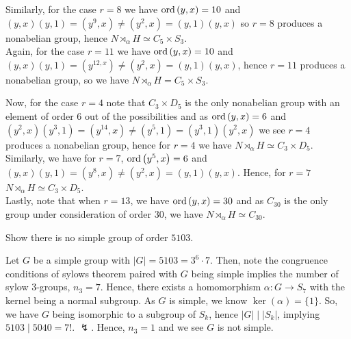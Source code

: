 \documentclass[a4paper]{article}
\begin{document}
\begin{solution}
\begin{enumerate}
				Similarly, for the case \(r = 8\) we have \(\operatorname{ord}\left( y, x \right)  = 10\) and \(\left( y, x \right) \left( y, 1 \right) = \left( y^{9}, x \right) \neq \left( y^2, x \right)  = \left( y, 1 \right) \left( y, x \right)  \) so \(r = 8\) produces a nonabelian group, hence \(N\rtimes_{\alpha} H \simeq C_5 \times S_3\).\\

				Again, for the case \(r = 11\) we have \(\operatorname{ord}\left( y, x \right)  = 10\) and \(\left( y, x \right) \left( y, 1 \right)  = \left( y^{12, x} \right) \neq \left( y^2, x \right)  = \left( y, 1 \right) \left( y, x \right)  \), hence \(r = 11\) produces a nonabelian group, so we have \(N \rtimes_{\alpha} H = C_5 \times S_3\).

				Now, for the case \(r = 4\) note that \(C_3 \times D_5\) is the only nonabelian group with an element of order \(6\) out of the possibilities and as \(\operatorname{ord}\left( y, x \right) =6\) and \(\left( y^2, x \right) \left( y^3, 1 \right) = \left( y^{14}, x \right) \neq \left( y^{5}, 1 \right) = \left( y^3, 1 \right) \left( y^2, x \right)   \) we see \(r = 4\) produces a nonabelian group, hence for \(r = 4\) we have \(N \rtimes_{\alpha} H \simeq C_3 \times D_5\).\\

				Similarly, we have for \(r = 7\), \(\operatorname{ord}\left( y^{5}, x \right) = 6 \) and \(\left( y, x \right) \left( y, 1 \right)  =\left( y^{8}, x \right)\neq \left( y^2, x \right)  = \left( y, 1 \right) \left( y ,x \right)  \). Hence, for \(r = 7\) \(N \rtimes_{\alpha} H \simeq C_3 \times D_5\).\\

				Lastly, note that when \(r = 13\), we have \(\operatorname{ord}\left( y, x \right)  = 30\) and as \(C_{30}\) is the only group under consideration of order \(30\), we have \(N\rtimes_{\alpha} H \simeq C_{30}\).
	\end{enumerate}
\end{solution}
\newpage
\begin{problem}[4]
	Show there is no simple group of order \(5103\).
\end{problem}
\begin{solution}
	Let \(G\) be a simple group with \(\left| G \right|  = 5103 = 3^{6} \cdot 7\). Then, note the congruence conditions of sylows theorem paired with \(G\) being simple implies the number of sylow \(3\)-groups, \(n_3 = 7 \). Hence, there exists a homomorphism \(\alpha : G \to S_7\) with the kernel being a normal subgroup. As \(G\) is simple, we know \(\ker \left( \alpha \right)  = \{1\} \). So, we have \(G\) being isomorphic to a subgroup of \(S_{k}\), hence \(\left| G \right|  \mid \left| S_{k} \right| \), implying \( 5103 \mid 5040 = 7! \). \(\lightning\). Hence, \(n_3 = 1\) and we see \(G\) is not simple.
\end{solution}
\end{document}
